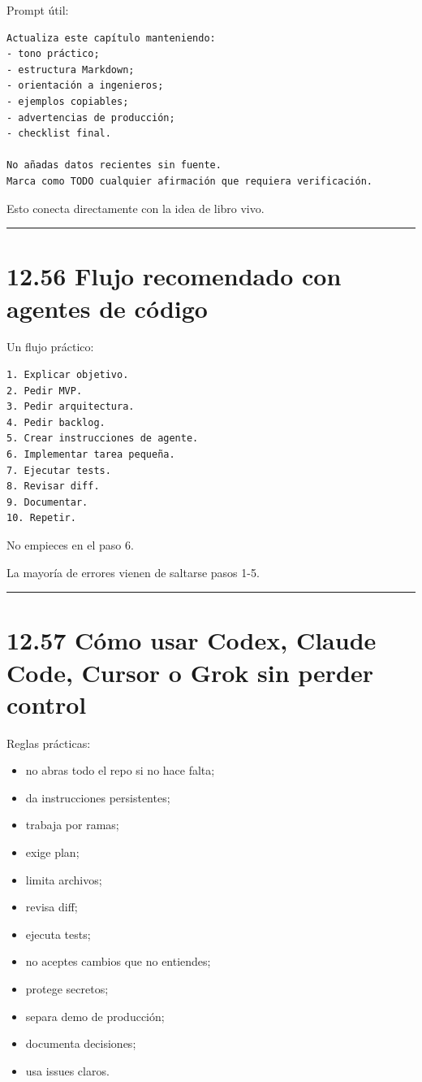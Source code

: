 Prompt útil:

\begin{lstlisting}
Actualiza este capítulo manteniendo:
- tono práctico;
- estructura Markdown;
- orientación a ingenieros;
- ejemplos copiables;
- advertencias de producción;
- checklist final.

No añadas datos recientes sin fuente.
Marca como TODO cualquier afirmación que requiera verificación.
\end{lstlisting}

Esto conecta directamente con la idea de libro vivo.

\begin{center}\rule{0.5\linewidth}{0.5pt}\end{center}

\section{12.56 Flujo recomendado con agentes de
código}\label{flujo-recomendado-con-agentes-de-cuxf3digo}

Un flujo práctico:

\begin{lstlisting}
1. Explicar objetivo.
2. Pedir MVP.
3. Pedir arquitectura.
4. Pedir backlog.
5. Crear instrucciones de agente.
6. Implementar tarea pequeña.
7. Ejecutar tests.
8. Revisar diff.
9. Documentar.
10. Repetir.
\end{lstlisting}

No empieces en el paso 6.

La mayoría de errores vienen de saltarse pasos 1-5.

\begin{center}\rule{0.5\linewidth}{0.5pt}\end{center}

\section{12.57 Cómo usar Codex, Claude Code, Cursor o Grok sin perder
control}\label{cuxf3mo-usar-codex-claude-code-cursor-o-grok-sin-perder-control}

Reglas prácticas:

\begin{itemize}
\tightlist
\item
  no abras todo el repo si no hace falta;
\item
  da instrucciones persistentes;
\item
  trabaja por ramas;
\item
  exige plan;
\item
  limita archivos;
\item
  revisa diff;
\item
  ejecuta tests;
\item
  no aceptes cambios que no entiendes;
\item
  protege secretos;
\item
  separa demo de producción;
\item
  documenta decisiones;
\item
  usa issues claros.
\end{itemize}

